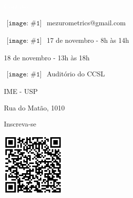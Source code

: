 
\newcommand{\ContactEntry}[2]{
	$\begin{array}{l}
	{\texttt{[image: \#1]}}
	\end{array}
	$ #2
}


\LARGE
\noindent\colorbox{materialGreen}
{\parbox[c][25pt][c]{\textwidth}{\hspace{15pt}\textcolor{white}{Contato}}} %

\begin{multicols}{3}

\large

\ContactEntry{images/green/mail9}{mezurometrics@gmail.com}

\ContactEntry{images/green/black70}{17 de novembro - 8h às 14h

\hspace*{28pt} 18 de novembro - 13h às 18h
}

\columnbreak

\ContactEntry{images/green/house3}{Auditório do CCSL

\hspace*{28pt} IME - USP

\hspace*{28pt} Rua do Matão, 1010}

\columnbreak

\hspace*{25pt} Inscreva-se
\vspace{.5cm}

\hspace*{25pt} \includegraphics[height=90pt]{images/design_sprint_form_qr.png}

\end{multicols}

